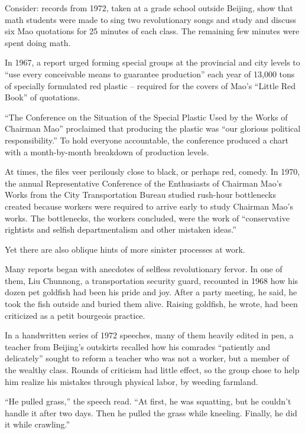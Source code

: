 ﻿\documentclass[12pt]{article}
\begin{document}
Consider: records from 1972, taken at a grade school outside Beijing, show that math students were
made to sing two revolutionary songs and study and discuss six Mao quotations for 25 minutes of each
class. The remaining few minutes were spent doing math.

In 1967, a report urged forming special groups at the provincial and city levels to ``use every
conceivable means to guarantee production'' each year of 13,000 tons of specially formulated red
plastic -- required for the covers of Mao's ``Little Red Book'' of quotations.

``The Conference on the Situation of the Special Plastic Used by the Works of Chairman Mao''
proclaimed that producing the plastic was ``our glorious political responsibility.'' To hold
everyone accountable, the conference produced a chart with a month-by-month breakdown of production
levels.

At times, the files veer perilously close to black, or perhaps red, comedy. In 1970, the annual
Representative Conference of the Enthusiasts of Chairman Mao's Works from the City Transportation
Bureau studied rush-hour bottlenecks created because workers were required to arrive early to study
Chairman Mao's works. The bottlenecks, the workers concluded, were the work of ``conservative
rightists and selfish departmentalism and other mistaken ideas.''

Yet there are also oblique hints of more sinister processes at work.

Many reports began with anecdotes of selfless revolutionary fervor. In one of them, Liu Chunnong, a
transportation security guard, recounted in 1968 how his dozen pet goldfish had been his pride and
joy. After a party meeting, he said, he took the fish outside and buried them alive. Raising
goldfish, he wrote, had been criticized as a petit bourgeois practice.

In a handwritten series of 1972 speeches, many of them heavily edited in pen, a teacher from
Beijing's outskirts recalled how his comrades ``patiently and delicately'' sought to reform a
teacher who was not a worker, but a member of the wealthy class. Rounds of criticism had little
effect, so the group chose to help him realize his mistakes through physical labor, by weeding
farmland.

``He pulled grass,'' the speech read. ``At first, he was squatting, but he couldn't handle it after
two days. Then he pulled the grass while kneeling. Finally, he did it while crawling.''
\end{document}
